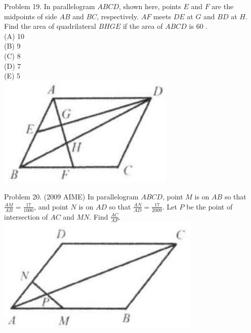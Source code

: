 \documentclass[10pt]{article}
\begin{document}
Problem 19. In parallelogram \(A B C D\), shown here, points \(E\) and \(F\) are the midpoints of side \(A B\) and \(B C\), respectively. \(A F\) meets \(D E\) at \(G\) and \(B D\) at \(H\). Find the area of quadrilateral \(B H G E\) if the area of \(A B C D\) is 60 .\\
(A) 10\\
(B) 9\\
(C) 8\\
(D) 7\\
(E) 5\\
\includegraphics[max width=\textwidth, center]{2025_04_17_97bc1f7e44d93c271a88g-129(1)}


Problem 20. (2009 AIME) In parallelogram \(A B C D\), point \(M\) is on \(A B\) so that \(\frac{A M}{A B}=\frac{17}{1000}\), and point \(N\) is on \(A D\) so that \(\frac{A N}{A D}=\frac{17}{2009}\). Let \(P\) be the point of intersection of \(A C\) and \(M N\). Find \(\frac{A C}{A P}\).\\
\includegraphics[max width=\textwidth, center]{2025_04_17_97bc1f7e44d93c271a88g-130(2)}
\end{document}
